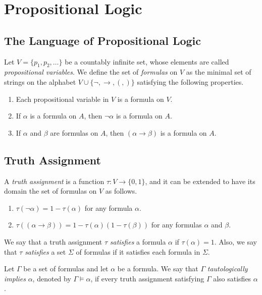 \chapter{Propositional Logic}
\section{The Language of Propositional Logic}
\begin{definition}
  Let $V = \{p_1, p_2, \dots\}$ be a countably infinite set, whose elements are
  called \emph{propositional variables}.
  We define the set of \emph{formulas} on $V$ as the minimal set of strings on
  the alphabet $V \cup \{\neg, \to, (, )\}$ satisfying the following
  properties.
  \begin{enumerate}
    \item Each propositional variable in $V$ is a formula on $V$.
    \item If $\alpha$ is a formula on $A$, then $\neg\alpha$ is a
    formula on $A$.
    \item If $\alpha$ and $\beta$ are formulas on $A$, then
    $(\alpha \to \beta)$ is a formula on $A$.
  \end{enumerate}
\end{definition}

\section{Truth Assignment}
\begin{definition}
  A \emph{truth assignment} is a function $\tau: V \to \{0, 1\}$, and it can be
  extended to have its domain the set of formulas on $V$ as follows.
  \begin{enumerate}
    \item $\tau(\neg\alpha) = 1 - \tau(\alpha)$ for any formula $\alpha$.
    \item $\tau((\alpha \to \beta)) = 1 - \tau(\alpha)
    (1 - \tau(\beta))$ for any formulas $\alpha$ and $\beta$.
  \end{enumerate}
\end{definition}

\begin{definition}
  We say that a truth assignment $\tau$ \emph{satisfies} a formula $\alpha$
  if $\tau(\alpha) = 1$.
  Also, we say that $\tau$ \emph{satisfies} a set $\Sigma$ of formulas if it
  satisfies each formula in $\Sigma$.
\end{definition}

\begin{definition}
  Let $\Gamma$ be a set of formulas and let $\alpha$ be a formula.
  We say that $\Gamma$ \emph{tautologically implies} $\alpha$, denoted by
  $\Gamma \vDash \alpha$, if every truth assignment satisfying $\Gamma$
  also satisfies $\alpha$.
\end{definition}

